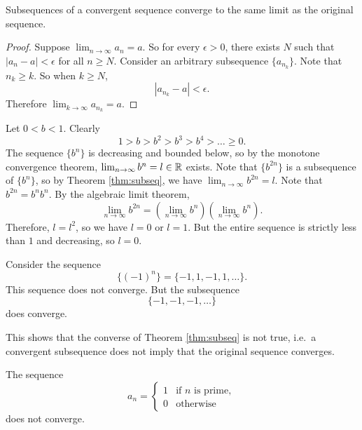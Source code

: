 \begin{theorem}
  \label{thm:subseq}
  Subsequences of a convergent sequence converge to the
  same limit as the original sequence.
\end{theorem}

\begin{proof}
  Suppose $\lim_{n \to \infty} a_n = a$. So for every
  $\epsilon > 0$, there exists $N$ such that
  $|a_n - a| < \epsilon$ for all $n \ge N$.
  Consider an arbitrary subsequence $\{a_{n_k}\}$.
  Note that $n_k \ge k$. So when $k \ge N$,
  \[|a_{n_k} - a| < \epsilon.\]
  Therefore $\lim_{k \to \infty} a_{n_k} = a$.
\end{proof}

\begin{example}
  Let $0 < b < 1$. Clearly
  \[1 > b > b^2 > b^3 > b^4 > \dots \ge 0.\]
  The sequence $\{b^n\}$ is decreasing and bounded below,
  so by the monotone convergence theorem,
  $\lim_{n \to \infty} b^n = l \in \mathbb{R}$ exists. Note that
  $\{b^{2n}\}$ is a subsequence of $\{b^n\}$, so
  by Theorem \ref{thm:subseq}, we have
  $\lim_{n \to \infty} b^{2n} = l$.
  Note that $b^{2n} = b^n b^n$. By the algebraic limit
  theorem,
  \[\lim_{n \to \infty} b^{2n} = \left(\lim_{n \to \infty} b^n\right)\left(\lim_{n \to \infty} b^n\right).\]
  Therefore, $l = l^2$, so we have $l = 0$ or $l = 1$. But
  the entire sequence is strictly less than $1$ and
  decreasing, so $l = 0$.
\end{example}

\begin{example}
  Consider the sequence
  \[\{(-1)^n\} = \{-1, 1, -1, 1, \dots\}.\]
  This sequence does not converge. But the
  subsequence
  \[
    \{-1, -1, -1, \dots\}
  \]
  does converge.
\end{example}

\begin{remark}
  This shows that the converse of Theorem \ref{thm:subseq} is
  not true, i.e.~a convergent subsequence does not
  imply that the original sequence converges.
\end{remark}

\begin{example}
  The sequence
  \[
    a_n =
    \begin{cases}
      1 & \text{if $n$ is prime}, \\
      0 & \text{otherwise}
    \end{cases}
  \]
  does not converge.
\end{example}

